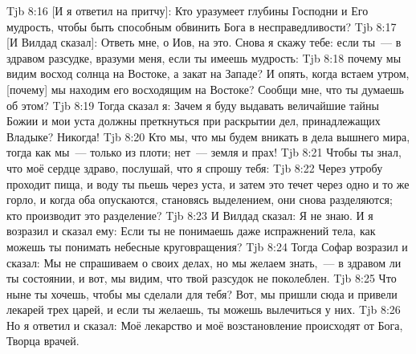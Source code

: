 \vs Tjb 8:16
[И я ответил на притчу]: Кто уразумеет глубины Господни и Его мудрость, чтобы быть способным обвинить Бога в несправедливости?
\vs Tjb 8:17
[И Вилдад сказал]: Ответь мне, о Иов, на это. Снова я скажу тебе: если ты~--- в здравом разсудке, вразуми меня, если ты имеешь мудрость:
\vs Tjb 8:18
почему мы видим восход солнца на Востоке, а закат на Западе? И опять, когда встаем утром, [почему] мы находим его восходящим на Востоке? Сообщи мне, что ты думаешь об этом?
\vs Tjb 8:19
Тогда сказал я: Зачем я буду выдавать величайшие тайны Божии и мои уста должны преткнуться при раскрытии дел, принадлежащих Владыке? Никогда!
\vs Tjb 8:20
Кто мы, что мы будем вникать в дела вышнего мира, тогда как мы~--- только из плоти; нет~--- земля и прах!
\vs Tjb 8:21
Чтобы ты знал, что моё сердце здраво, послушай, что я спрошу тебя:
\vs Tjb 8:22
Через утробу проходит пища, и воду ты пьешь через уста, и затем это течет через одно и то же горло, и когда оба опускаются, становясь выделением, они снова разделяются; кто производит это разделение?
\vs Tjb 8:23
И Вилдад сказал: Я не знаю. И я возразил и сказал ему: Если ты не понимаешь даже испражнений тела, как можешь ты понимать небесные круговращения?
\vs Tjb 8:24
Тогда Софар возразил и сказал: Мы не спрашиваем о своих делах, но мы желаем знать,~--- в здравом ли ты состоянии, и вот, мы видим, что твой разсудок не поколеблен.
\vs Tjb 8:25
Что ныне ты хочешь, чтобы мы сделали для тебя? Вот, мы пришли сюда и привели лекарей трех царей, и если ты желаешь, ты можешь вылечиться у них.
\vs Tjb 8:26
Но я ответил и сказал: Моё лекарство и моё возстановление происходят от Бога, Творца врачей.

